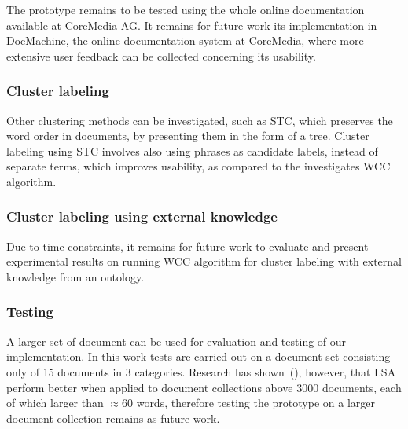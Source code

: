 The prototype remains to be tested using the whole online documentation available at CoreMedia AG. It remains for future work its implementation in DocMachine, the online documentation system at CoreMedia, where more extensive user feedback can be collected concerning its usability.

\subsubsection{Cluster labeling}
Other clustering methods can be investigated, such as \gls{STC}, which preserves the word order in documents, by presenting them in the form of a tree. Cluster labeling using \gls{STC} involves also using phrases as candidate labels, instead of separate terms, which improves usability, as compared 
to the investigates \gls{WCC} algorithm. \\

\subsubsection{Cluster labeling using external knowledge}
Due to time constraints, it remains for future work to evaluate and present experimental results on running \gls{WCC} algorithm for cluster labeling with external knowledge from an ontology. \\

\subsubsection{Testing}
A larger set of document can be used for evaluation and testing of our implementation. In this work tests are carried out on a document set consisting only of 15 documents in 3 categories. Research has shown~(\cite{dumais91improving}), however, that \gls{LSA} perform better when applied to document collections above 3000 documents, each of which larger than $\approx 60$ words, therefore testing the prototype on a larger document collection remains as future work. \\

